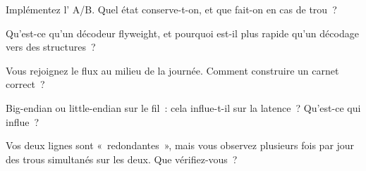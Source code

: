 \begin{interviewq}\label{iq:ll:protocols-ii-binary-exchange-protocols:2}
Implémentez l' A/B. Quel état conserve-t-on, et que fait-on en cas de trou~?
\end{interviewq}

\begin{interviewq}\label{iq:ll:protocols-ii-binary-exchange-protocols:3}
Qu'est-ce qu'un décodeur flyweight, et pourquoi est-il plus rapide qu'un décodage vers des structures~?
\end{interviewq}

\begin{interviewq}\label{iq:ll:protocols-ii-binary-exchange-protocols:4}
Vous rejoignez le flux au milieu de la journée. Comment construire un carnet correct~?
\end{interviewq}

\begin{interviewq}\label{iq:ll:protocols-ii-binary-exchange-protocols:5}
Big-endian ou little-endian sur le fil~: cela influe-t-il sur la latence~? Qu'est-ce qui influe~?
\end{interviewq}

\begin{interviewq}\label{iq:ll:protocols-ii-binary-exchange-protocols:6}
Vos deux lignes sont «~redondantes~», mais vous observez plusieurs fois par jour des trous simultanés sur les deux. Que vérifiez-vous~?
\end{interviewq}
